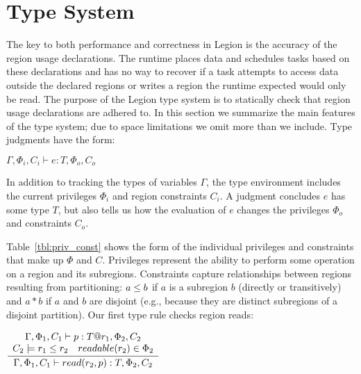 \section{Type System}
\label{sec:type}

The key to both performance and correctness in Legion is the
accuracy of the region usage declarations.  The runtime places data and
schedules tasks based on these declarations and has no way to recover if a 
task attempts to access data outside the declared regions or
writes a region the runtime expected would only be read.
The purpose of the Legion type system is to statically check that region usage declarations are adhered to.
In this section we summarize the main features of the type system; due to space limitations we omit more than
we include.
Type judgments have the form:
\begin{center}
$\Gamma, \Phi_i, C_i \vdash e : T, \Phi_o, C_o$
\end{center}
In addition to tracking the types of variables $\Gamma$, the
type environment includes the current privileges $\Phi_i$ 
and region constraints $C_i$.  A judgment concludes $e$ has some type $T$,
but also tells us how the evaluation of $e$ changes the privileges $\Phi_o$ and constraints $C_o$.

Table~\ref{tbl:priv_const} shows the form of the individual privileges and
constraints that make up $\Phi$ and $C$.  Privileges represent the ability to
perform some operation on a region and its subregions.  Constraints capture relationships between regions
resulting from partitioning: $a \leq b$ if $a$ is a subregion $b$ (directly or transitively) and $a \ast b$ if
$a$ and $b$ are disjoint (e.g., because they are distinct subregions of a disjoint partition).
Our first type rule checks region reads:

\begin{center}
{\small
\begin{math}
\infrule{
\begin{array}{lc}
  \multicolumn{2}{c}{\Gamma, \Phi_1, C_1 \vdash p : T@r_1, \Phi_2, C_2} \\
  C_2 \models r_1 \le r_2 & readable(r_2) \in \Phi_2
\end{array}
}
{
  \Gamma, \Phi_1, C_1 \vdash read(r_2, p) : T, \Phi_2, C_2
}
\end{math} 
}
\end{center}

